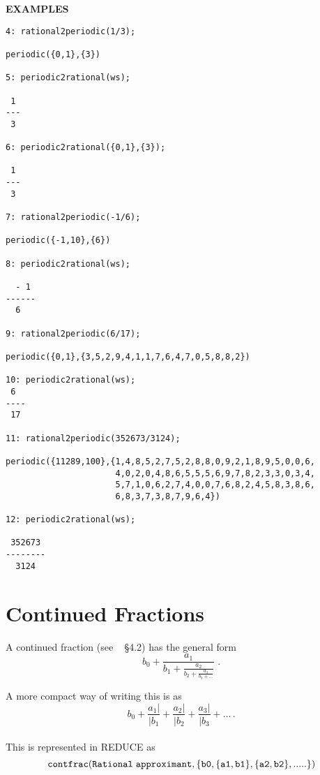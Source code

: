 {\large\bf EXAMPLES}\\
\begin{verbatim}
4: rational2periodic(1/3);

periodic({0,1},{3})

5: periodic2rational(ws);

 1
---
 3

6: periodic2rational({0,1},{3});

 1
---
 3

7: rational2periodic(-1/6);

periodic({-1,10},{6})

8: periodic2rational(ws);

  - 1
------
  6

9: rational2periodic(6/17);

periodic({0,1},{3,5,2,9,4,1,1,7,6,4,7,0,5,8,8,2})

10: periodic2rational(ws);
 6
----
 17

11: rational2periodic(352673/3124);

periodic({11289,100},{1,4,8,5,2,7,5,2,8,8,0,9,2,1,8,9,5,0,0,6,
                      4,0,2,0,4,8,6,5,5,5,6,9,7,8,2,3,3,0,3,4,
                      5,7,1,0,6,2,7,4,0,0,7,6,8,2,4,5,8,3,8,6,
                      6,8,3,7,3,8,7,9,6,4})

12: periodic2rational(ws);

 352673
--------
  3124

\end{verbatim}
\section{Continued Fractions}


A continued fraction (see ~\cite{PA} \S 4.2) has the general form
{\Large
\[b_0 + \frac{a_1}{b_1 +
         \frac{a_2}{b_2+
          \frac{a_3}{b_3 + \ldots
        }}}
\;.\]
}

A more compact way of writing this is as
\[b_0 + \frac{a_1|}{|b_1} + \frac{a_2|}{|b_2} + \frac{a_3|}{|b_3} + \ldots\,.\]
\\
This is represented in {\small REDUCE} as
\[{\tt
   contfrac({\sl Rational\hspace{1mm} approximant},
                \{b0, \{a1,b1\}, \{a2,b2\},.....\})
}\]

